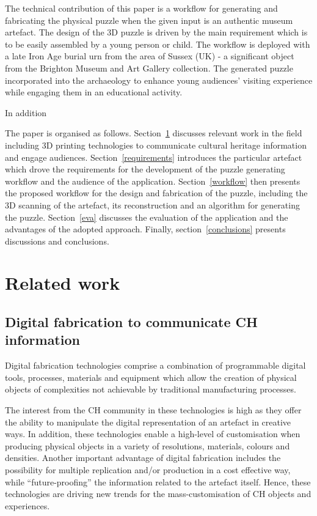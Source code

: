 \documentclass[acmlarge,screen,dvipsnames]{acmart}
\begin{document}
The technical contribution of this paper is a workflow for generating
and fabricating the physical puzzle when the given input is an
authentic museum artefact. The design of the 3D puzzle is driven by
the main requirement which is to be easily assembled by a young person
or child. The workflow is deployed with a late Iron Age burial urn
from the area of Sussex (UK) - a significant object from the Brighton
Museum and Art Gallery collection. The generated puzzle 
incorporated into the archaeology  to enhance young audiences' visiting experience while
engaging them in an educational activity.

In addition

The paper is organised as follows. Section~\ref{related} discusses
relevant work in the field including 3D printing technologies to
communicate cultural heritage information and engage
audiences. Section~\ref{requirements} introduces the particular
artefact which drove the requirements for the development of the
puzzle generating workflow and the audience of the
application. Section~\ref{workflow} then presents the proposed
workflow for the design and fabrication of the puzzle, including the
3D scanning of the artefact, its reconstruction and an algorithm for
generating the puzzle. Section~\ref{eva} discusses the evaluation of
the application and the advantages of the adopted approach. Finally,
section~\ref{conclusions} presents discussions and conclusions.

\section{Related work}
\label{related}

\subsection{Digital fabrication to communicate CH information}

Digital fabrication technologies comprise a combination of
programmable digital tools, processes, materials and equipment which
allow the creation of physical objects of complexities not achievable
by traditional manufacturing processes.

The interest from the CH community in these technologies is high as
they offer the ability to manipulate the digital representation of an
artefact in creative ways. In addition, these technologies enable a
high-level of customisation when producing physical objects in a
variety of resolutions, materials, colours and densities. Another
important advantage of digital fabrication includes the possibility
for multiple replication and/or production in a cost effective way,
while ``future-proofing'' the information related to the artefact
itself. Hence, these technologies are driving new trends for the
mass-customisation of CH objects and experiences.
\end{document}
